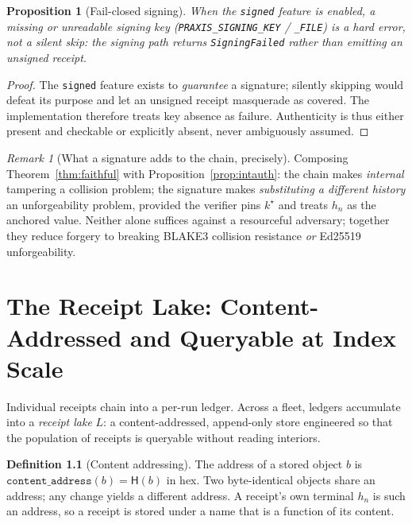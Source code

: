 \documentclass[11pt,oneside]{book}
\theoremstyle{definition}
\newtheorem{definition}{Definition}[chapter]
\theoremstyle{plain}
\newtheorem{proposition}[theorem]{Proposition}
\theoremstyle{remark}
\newtheorem*{remark}{Remark}
\newcommand{\chainH}{\mathsf{H}}               %
\newcommand{\code}[1]{\texttt{#1}}
\newcommand{\Lake}{L}                 %
\begin{document}
\begin{proposition}[Fail-closed signing]\label{prop:failclosed}
When the \code{signed} feature is enabled, a missing or unreadable signing key (\code{PRAXIS\_SIGNING\_KEY} / \code{\_FILE}) is a hard error, not a silent skip: the signing path returns \code{SigningFailed} rather than emitting an unsigned receipt. %
\end{proposition}

\begin{proof}
The \code{signed} feature exists to \emph{guarantee} a signature; silently skipping would defeat its purpose and let an unsigned receipt masquerade as covered. %
The implementation therefore treats key absence as failure. %
Authenticity is thus either present and checkable or explicitly absent, never ambiguously assumed. %
\end{proof} %

\begin{remark}[What a signature adds to the chain, precisely]
Composing Theorem~\ref{thm:faithful} with Proposition~\ref{prop:intauth}: the chain makes \emph{internal} tampering a collision problem; the signature makes \emph{substituting a different history} an unforgeability problem, provided the verifier pins $k^{\star}$ and treats $h_n$ as the anchored value. %
Neither alone suffices against a resourceful adversary; together they reduce forgery to breaking BLAKE3 collision resistance \emph{or} Ed25519 unforgeability. %
\end{remark}

\chapter{The Receipt Lake: Content-Addressed and Queryable at Index Scale}
\label{ch:lake}

Individual receipts chain into a per-run ledger. %
Across a fleet, ledgers accumulate into a \emph{receipt lake} $\Lake$: a content-addressed, append-only store engineered so that the population of receipts is queryable without reading interiors. %

\begin{definition}[Content addressing]\label{def:contentaddr}
The address of a stored object $b$ is $\code{content\_address}(b)=\chainH(b)$ in hex. %
Two byte-identical objects share an address; any change yields a different address. %
A receipt's own terminal $h_n$ is such an address, so a receipt is stored under a name that is a function of its content. %
\end{definition}
\end{document}
